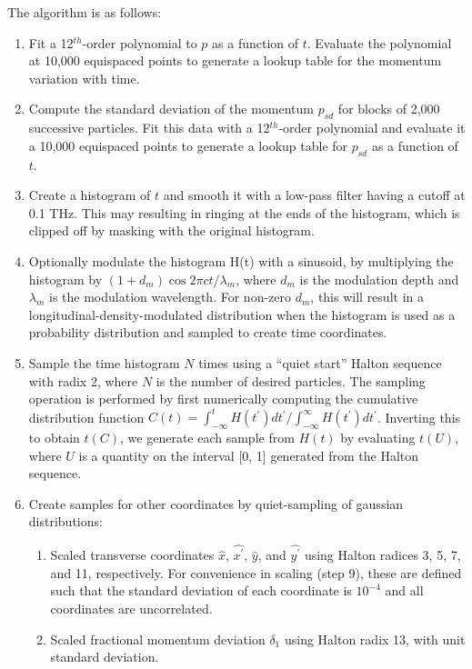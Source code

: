 \documentclass[11pt]{article}
\begin{document}
\begin{itemize}
The algorithm is as follows:
\begin{enumerate}
\item Fit a 12$^{th}$-order polynomial to $p$ as a function of $t$.  Evaluate
 the polynomial at 10,000 equispaced points to generate a lookup table for the momentum
 variation with time.
\item Compute the standard deviation of the momentum $p_{sd}$ for blocks of 2,000 successive
 particles.  Fit this data with a 12$^{th}$-order polynomial and evaluate 
 it a 10,000 equispaced points to generate a lookup table for $p_{sd}$ as a function of $t$.
\item Create a histogram of $t$ and smooth it with a low-pass filter having a cutoff at
 0.1 THz.  This may resulting in ringing at the ends of the histogram, which is clipped off
 by masking with the original histogram. 
\item Optionally modulate the histogram H(t) with a sinusoid, by
 multiplying the histogram by $(1 + d_m) \cos 2\pi c t/\lambda_m$, where $d_m$
 is the modulation depth and $\lambda_m$ is the modulation wavelength. For non-zero $d_m$,
 this will result in a longitudinal-density-modulated distribution when the histogram is
 used as a probability distribution and sampled to create time coordinates.
\item Sample the time histogram $N$ times using a ``quiet start'' Halton sequence with
 radix 2, where $N$ is the number of desired particles.  The sampling
 operation is performed by first numerically computing the cumulative
 distribution function $C(t)=\int_{-\infty}^t H(t^\prime)
 dt^\prime/\int_{-\infty}^\infty H(t^\prime) dt^\prime$.  Inverting
 this to obtain $t(C)$, we generate each sample from $H(t)$ by
 evaluating $t(U)$, where $U$ is a quantity on the interval [0, 1] generated
 from the Halton sequence.
\item Create samples for other coordinates by quiet-sampling of gaussian distributions:
 \begin{enumerate}
 \item Scaled transverse coordinates $\hat{x}$, $\hat{x^\prime}$,
 $\hat{y}$, and $\hat{y^\prime}$ using Halton radices 3, 5, 7, and 11,
 respectively.  For convenience in scaling (step 9), these are defined such that the standard deviation of
 each coordinate is $10^{-4}$ and all coordinates are uncorrelated.
 \item Scaled fractional momentum deviation $\delta_1$ using Halton radix 13, with
 unit standard deviation.
 \end{enumerate}

\end{enumerate}
\end{itemize}
\end{document}
